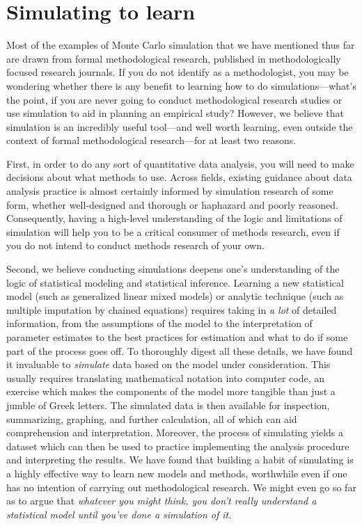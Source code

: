 \documentclass[
]{book}
\begin{document}
\section{Simulating to learn}\label{simulating-to-learn}

Most of the examples of Monte Carlo simulation that we have mentioned thus far are drawn from formal methodological research, published in methodologically focused research journals.
If you do not identify as a methodologist, you may be wondering whether there is any benefit to learning how to do simulations---what's the point, if you are never going to conduct methodological research studies or use simulation to aid in planning an empirical study?
However, we believe that simulation is an incredibly useful tool---and well worth learning, even outside the context of formal methodological research---for at least two reasons.

First, in order to do any sort of quantitative data analysis, you will need to make decisions about what methods to use.
Across fields, existing guidance about data analysis practice is almost certainly informed by simulation research of some form, whether well-designed and thorough or haphazard and poorly reasoned.
Consequently, having a high-level understanding of the logic and limitations of simulation will help you to be a critical consumer of methods research, even if you do not intend to conduct methods research of your own.

Second, we believe conducting simulations deepens one's understanding of the logic of statistical modeling and statistical inference.
Learning a new statistical model (such as generalized linear mixed models) or analytic technique (such as multiple imputation by chained equations) requires taking in \emph{a lot} of detailed information, from the assumptions of the model to the interpretation of parameter estimates to the best practices for estimation and what to do if some part of the process goes off.
To thoroughly digest all these details, we have found it invaluable to \emph{simulate} data based on the model under consideration.
This usually requires translating mathematical notation into computer code, an exercise which makes the components of the model more tangible than just a jumble of Greek letters.
The simulated data is then available for inspection, summarizing, graphing, and further calculation, all of which can aid comprehension and interpretation.
Moreover, the process of simulating yields a dataset which can then be used to practice implementing the analysis procedure and interpreting the results.
We have found that building a habit of simulating is a highly effective way to learn new models and methods, worthwhile even if one has no intention of carrying out methodological research.
We might even go so far as to argue that \emph{whatever you might think, you don't really understand a statistical model until you've done a simulation of it.}
\end{document}
